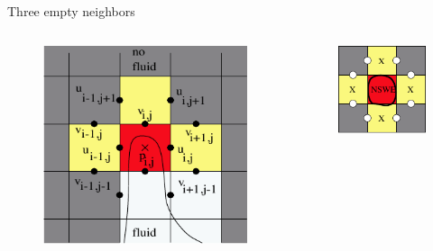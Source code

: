 \documentclass{beamer}
\begin{document}
	\begin{frame}{Three empty neighbors}
	  \begin{columns}
	 	\begin{column}[c]{0.4\textwidth}
	 	   \begin{figure}
			\includegraphics[width=1\textwidth]{pic/three.pdf}
			\end{figure}
		\end{column}
		\begin{column}[c]{0.4\textwidth}
	 	   \begin{figure}
	 	   			\includegraphics[width=1\textwidth]{pic/four.pdf}
			\end{figure}
		\end{column}
	\end{columns}
   \end{frame}	
		
\end{document}
